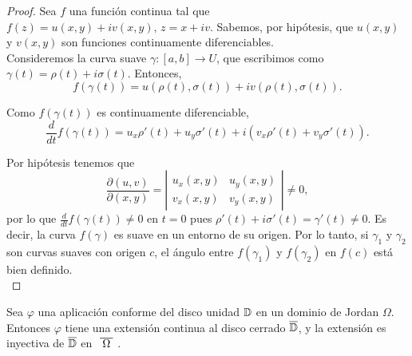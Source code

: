 \begin{proof}
    Sea $f$ una función continua tal que $f(z) = u(x,y) + i v(x,y), \, z = x+iv$. Sabemos, por hipótesis, que $u(x,y)$ y $v(x,y)$ son funciones continuamente diferenciables. \\

    Consideremos la curva suave $\gamma : [a,b] \to U$, que escribimos como $\gamma (t) = \rho (t) + i \sigma (t)$. Entonces,
    \begin{equation*}
        f(\gamma (t)) = u(\rho (t), \sigma (t)) + i v(\rho (t), \sigma (t)).
    \end{equation*}

    Como $f(\gamma (t))$ es continuamente diferenciable,
    \begin{equation}
        \label{eq:cauchy-riemann}
        \frac{d}{dt}f(\gamma (t)) = u_x \rho' (t) + u_y \sigma' (t) + i (v_x \rho'(t) + v_y \sigma'(t)).
    \end{equation}

    Por hipótesis tenemos que
    \begin{equation*}
        \frac{\partial (u,v)}{\partial (x,y)} =
        \left|
        \begin{matrix}
            u_x(x,y) & u_y(x,y) \\ v_x(x,y) & v_y(x,y)
        \end{matrix}
        \right| \not = 0,
    \end{equation*}
    por lo que $\frac{d}{dt} f(\gamma (t)) \not = 0$ en $t = 0$ pues $\rho' (t) + i \sigma' (t) = \gamma' (t) \not = 0$. Es decir, la curva $f (\gamma)$ es suave en un entorno de su origen. Por lo tanto, si $\gamma_1$ y $\gamma_2$ son curvas suaves con origen $c$, el ángulo entre $f(\gamma_1)$ y $f(\gamma_2)$ en $f(c)$ está bien definido. \\
\end{proof}

\begin{theorem}
    \label{th:caratheodory}
    Sea $\varphi$ una aplicación conforme del disco unidad $\mathbb{D}$ en un dominio de Jordan $\Omega$. Entonces $\varphi$ tiene una extensión continua al disco cerrado $\overline{\mathbb{D}}$, y la extensión es inyectiva de $\overline{\mathbb{D}}$ en $\xbar{\Omega}$.
\end{theorem}

